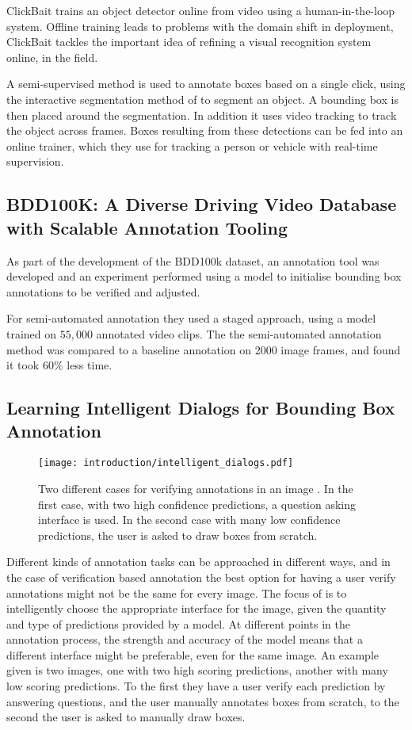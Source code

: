 ClickBait trains an object detector online from video using a human-in-the-loop system. Offline training leads to problems with the domain shift in deployment, ClickBait tackles the important idea of refining a visual recognition system online, in the field.

A semi-supervised method is used to annotate boxes based on a single click, using the interactive segmentation method of \cite{Xu2016} to segment an object. A bounding box is then placed around the segmentation. In addition it uses video tracking to track the object across frames. Boxes resulting from these detections can be fed into an online trainer, which they use for tracking a person or vehicle with real-time supervision.


\subsection{BDD100K: A Diverse Driving Video Database with
Scalable Annotation Tooling \cite{Yu2018a}}

As part of the development of the BDD100k dataset, an annotation tool was developed and an experiment performed using a model to initialise bounding box annotations to be verified and adjusted. 

For semi-automated annotation they used a staged approach, using a model trained on $55,000$ annotated video clips. The the semi-automated annotation method was compared to a baseline annotation on 2000 image frames, and found it took $60\%$ less time.

\subsection{Learning Intelligent Dialogs for Bounding Box Annotation}

\begin{figure}[h]
  \centering
  \texttt{[image: introduction/intelligent\_dialogs.pdf]}
  \caption{Two different cases for verifying annotations in an image \cite{Konyushkova2017}. In the first case, with two high confidence predictions, a question asking interface is used. In the second case with many low confidence predictions, the user is asked to draw boxes from scratch. }
  \label{fig:intelligent_dialogs}
\end{figure}

Different kinds of annotation tasks can be approached in different ways, and in the case of verification based annotation the best option for having a user verify annotations might not be the same for every image. The focus of \cite{Konyushkova2017} is to intelligently choose the appropriate interface for the image, given the quantity and type of predictions provided by a model. At different points in the annotation process, the strength and accuracy of the model means that a different interface might be preferable, even for the same image. An example given is two images, one with two high scoring predictions, another with many low scoring predictions. To the first they have a user  verify each prediction by answering questions, and the user manually annotates boxes from scratch, to the second the user is asked to manually draw boxes. 


